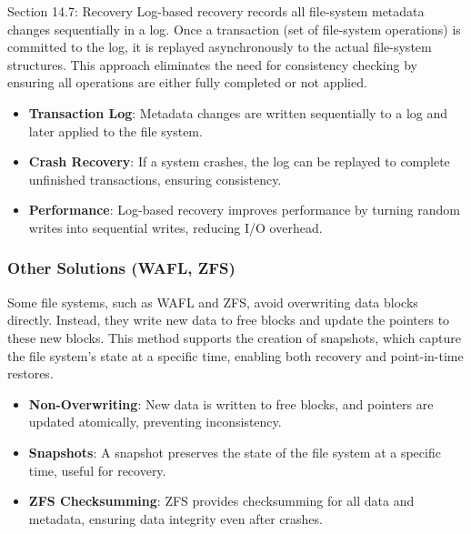 \begin{notes}{Section 14.7: Recovery}
    Log-based recovery records all file-system metadata changes sequentially in a log. Once a transaction (set of file-system operations) is committed to the log, it is replayed asynchronously to the 
    actual file-system structures. This approach eliminates the need for consistency checking by ensuring all operations are either fully completed or not applied.
    
    \begin{highlight}
    
        \begin{itemize}
            \item \textbf{Transaction Log}: Metadata changes are written sequentially to a log and later applied to the file system.
            \item \textbf{Crash Recovery}: If a system crashes, the log can be replayed to complete unfinished transactions, ensuring consistency.
            \item \textbf{Performance}: Log-based recovery improves performance by turning random writes into sequential writes, reducing I/O overhead.
        \end{itemize}
    
    \end{highlight}
    
    \subsubsection*{Other Solutions (WAFL, ZFS)}
    
    Some file systems, such as WAFL and ZFS, avoid overwriting data blocks directly. Instead, they write new data to free blocks and update the pointers to these new blocks. This method supports the 
    creation of snapshots, which capture the file system's state at a specific time, enabling both recovery and point-in-time restores.
    
    \begin{highlight}
    
        \begin{itemize}
            \item \textbf{Non-Overwriting}: New data is written to free blocks, and pointers are updated atomically, preventing inconsistency.
            \item \textbf{Snapshots}: A snapshot preserves the state of the file system at a specific time, useful for recovery.
            \item \textbf{ZFS Checksumming}: ZFS provides checksumming for all data and metadata, ensuring data integrity even after crashes.
        \end{itemize}
    

\end{highlight}
\end{notes}
